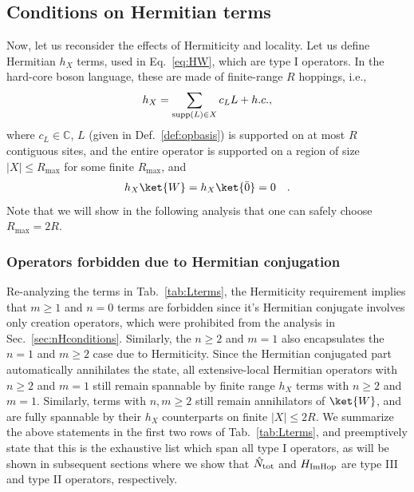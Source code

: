 \documentclass[prx,letterpaper,aps,superscriptaddress,floatfix,twocolumn,nofootinbib]{revtex4-2}
\theoremstyle{definition}
\begin{document}
\subsection{Conditions on Hermitian terms}\label{sec:Hconditions}
%
%
Now, let us reconsider the effects of Hermiticity and locality.
%
Let us define Hermitian $h_X$ terms, used in Eq.~\eqref{eq:HW}, which are type I operators.
%
In the hard-core boson language, these are made of finite-range $R$ hoppings, i.e.,
\begin{equation}
h_X=\sum_{{\rm supp}(L)\in X} c_L L+h.c.,
\end{equation}
where $c_L\in\mathbb{C}$, $L$ (given in Def.~\ref{def:opbasis}) is supported on at most $R$ contiguous sites, and the entire operator is supported on a region of size $|X|\leq R_{\text{max}}$ for some finite $R_{\text{max}}$, and
\begin{align}
    h_X\ket{W}=h_X\ket{\bar{0}}=0\quad.
    \label{eq:annihilationcond}
\end{align}
%
Note that we will show in the following analysis that one can safely choose $R_{\text{max}}=2R$.
%

%
\subsubsection{Operators forbidden due to Hermitian conjugation}
%
Re-analyzing the terms in Tab.~\ref{tab:Lterms}, the Hermiticity requirement implies that $m\geq 1$ and $n=0$ terms are forbidden since it's Hermitian conjugate involves only creation operators, which were prohibited from the analysis in Sec.~\ref{sec:nHconditions}. 
%
Similarly, the $n\geq2$ and $m=1$ also encapsulates the $n=1$ and $m\geq 2$ case due to Hermiticity.
%
Since the Hermitian conjugated part automatically annihilates the state, all extensive-local Hermitian operators with $n\geq2$ and $m=1$ still remain spannable by finite range $h_X$ terms with $n\geq2$ and $m=1$.
%
Similarly, terms with $n,m\geq 2$ still remain annihilators of $\ket{W}$, and are fully spannable by their $h_X$ counterparts on finite $|X|\leq 2R$.
%
We summarize the above statements in the first two rows of Tab.~\ref{tab:Lterms}, and preemptively state that this is the exhaustive list which span all type I operators, as will be shown in subsequent sections where we show that $\hat{N}_{\rm tot}$ and $H_{\rm ImHop}$ are type III and type II operators, respectively.
%
%
\end{document}
